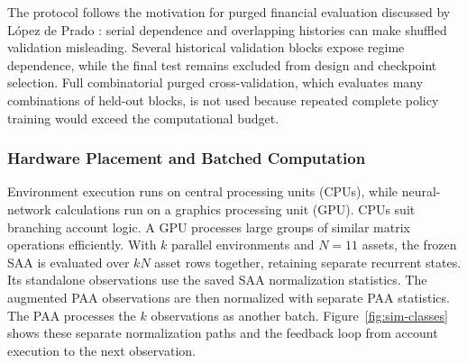 The protocol follows the motivation for purged financial evaluation discussed by L\'opez de Prado \cite{LopezdePrado.2018}: serial dependence and overlapping histories can make shuffled validation misleading. Several historical validation blocks expose regime dependence, while the final test remains excluded from design and checkpoint selection. Full combinatorial purged cross-validation, which evaluates many combinations of held-out blocks, is not used because repeated complete policy training would exceed the computational budget.

\subsubsection{Hardware Placement and Batched Computation}

Environment execution runs on central processing units (CPUs), while neural-network calculations run on a graphics processing unit (GPU). CPUs suit branching account logic. A GPU processes large groups of similar matrix operations efficiently. With \(k\) parallel environments and \(N=11\) assets, the frozen SAA is evaluated over \(kN\) asset rows together, retaining separate recurrent states. Its standalone observations use the saved SAA normalization statistics. The augmented PAA observations are then normalized with separate PAA statistics. The PAA processes the \(k\) observations as another batch. Figure~\ref{fig:sim-classes} shows these separate normalization paths and the feedback loop from account execution to the next observation.

